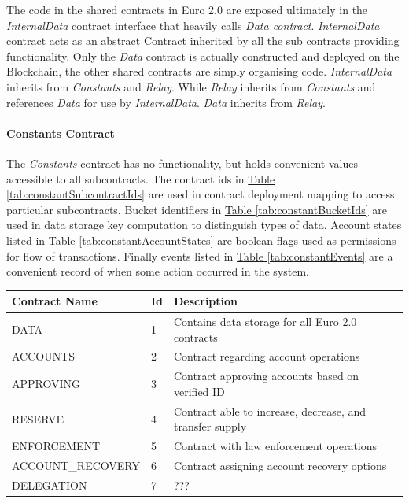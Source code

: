 \documentclass[a4paper,12pt]{article} %
\newcommand{\hypertableref}[1]{\hyperref[#1]{Table \ref{#1}}}
\begin{document}
{{The code in the shared contracts in Euro 2.0 are exposed ultimately in the \textit{InternalData} contract interface that heavily calls \textit{Data contract}. \textit{InternalData} contract acts as an abstract Contract inherited by all the sub contracts providing functionality. Only the \textit{Data} contract is actually constructed and deployed on the Blockchain, the other shared contracts are simply organising code. \textit{InternalData} inherits from \textit{Constants} and \textit{Relay}. While \textit{Relay} inherits from \textit{Constants} and references \textit{Data} for use by \textit{InternalData}. \textit{Data} inherits from \textit{Relay}.

\paragraph{Constants Contract}

The \textit{Constants} contract has no functionality, but holds convenient values accessible to all subcontracts. The contract ids in \hypertableref{tab:constantSubcontractIds} are used in contract deployment mapping to access particular subcontracts. Bucket identifiers in \hypertableref{tab:constantBucketIds} are used in data storage key computation to distinguish types of data. Account states listed in \hypertableref{tab:constantAccountStates} are boolean flags used as permissions for flow of transactions. Finally events listed in \hypertableref{tab:constantEvents} are a convenient record of when some action occurred in the system.

\begin{center}
\begin{tabular}{ | l | l | p{10cm} | }
 \hline
 Contract Name & Id & Description
 \\ \hline\hline
 DATA & 1 & Contains data storage for all Euro 2.0 contracts
 \\ \hline
 ACCOUNTS & 2 & Contract regarding account operations
 \\ \hline
 APPROVING & 3 & Contract approving accounts based on verified ID
 \\ \hline
 RESERVE & 4 & Contract able to increase, decrease, and transfer supply
 \\ \hline
 ENFORCEMENT & 5 & Contract with law enforcement operations
 \\ \hline
 ACCOUNT\_RECOVERY & 6 & Contract assigning account recovery options
 \\ \hline
 DELEGATION & 7 & ???
 \\ \hline
\end{tabular}
\end{center}
\label{tab:constantSubcontractIds}

}}
\end{document}
